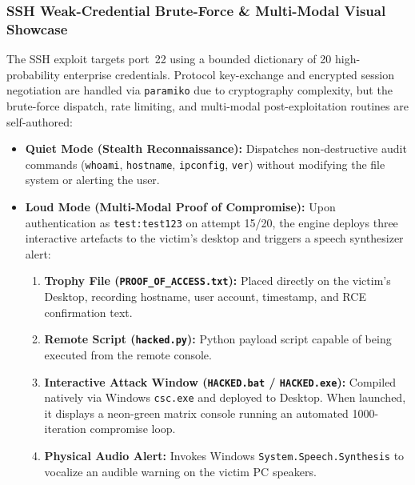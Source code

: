 \subsubsection{SSH Weak-Credential Brute-Force \& Multi-Modal Visual Showcase}
The SSH exploit targets port~22 using a bounded dictionary of 20 high-probability enterprise
credentials. Protocol key-exchange and encrypted session negotiation are handled via \texttt{paramiko}
due to cryptography complexity, but the brute-force dispatch, rate limiting, and multi-modal
post-exploitation routines are self-authored:
\begin{itemize}
    \item \textbf{Quiet Mode (Stealth Reconnaissance):} Dispatches non-destructive audit commands
    (\texttt{whoami}, \allowbreak\texttt{hostname}, \allowbreak\texttt{ipconfig}, \allowbreak\texttt{ver}) without modifying the file
    system or alerting the user.
    \item \textbf{Loud Mode (Multi-Modal Proof of Compromise):} Upon authentication as
    \texttt{test:test123} on attempt 15/20, the engine deploys three interactive artefacts to the
    victim's desktop and triggers a speech synthesizer alert:
    \begin{enumerate}
        \item \textbf{Trophy File (\texttt{PROOF\_OF\_ACCESS.txt}):} Placed directly on the victim's
        Desktop, recording hostname, user account, timestamp, and RCE confirmation text.
        \item \textbf{Remote Script (\texttt{hacked.py}):} Python payload script capable of being
        executed from the remote console.
        \item \textbf{Interactive Attack Window (\texttt{HACKED.bat} / \texttt{HACKED.exe}):} Compiled
        natively via Windows \texttt{csc.exe} and deployed to Desktop. When launched, it displays a
        neon-green matrix console running an automated 1000-iteration compromise loop.
        \item \textbf{Physical Audio Alert:} Invokes Windows \texttt{System.Speech.Synthesis} to vocalize
        an audible warning on the victim PC speakers.
    \end{enumerate}
\end{itemize}

